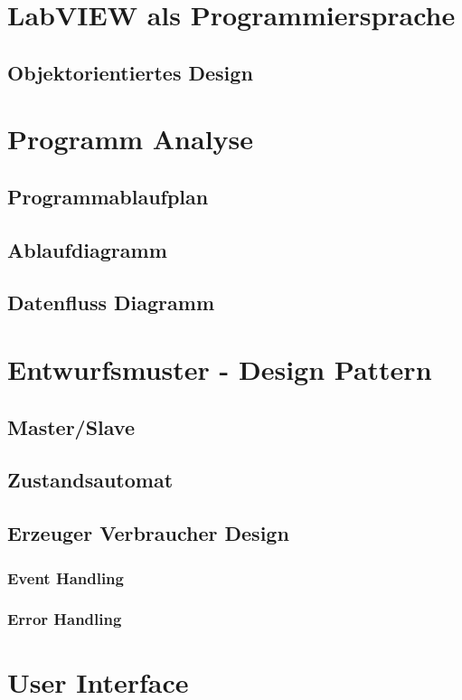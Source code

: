 
\section{LabVIEW als Programmiersprache}
	\label{sec:labview}
	\subsection{Objektorientiertes Design}  %

\section{Programm Analyse}
		\subsection{Programmablaufplan} %
		\subsection{Ablaufdiagramm }
		\subsection{Datenfluss Diagramm}

\section{Entwurfsmuster - Design Pattern}
		\subsection{Master/Slave}
		\subsection{Zustandsautomat}%
		\subsection{Erzeuger Verbraucher Design} %
		\subsubsection{Event Handling}
		\subsubsection{Error Handling} %
		
\section{User Interface}

